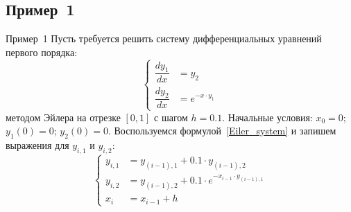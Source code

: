 \documentclass[aspectratio=169, mathserif]{beamer}	%
\begin{document}
\subsection{Пример~1}
\begin{frame}[fragile, ]{Пример~1}\label{slide:example1}
\scriptsize
Пусть требуется решить систему дифференциальных уравнений первого порядка:
\vfill
\begin{equation*}
	\left\{
	\begin{aligned}
		\dfrac{dy_1}{dx} &= y_2 \\
		\dfrac{dy_2}{dx} &= e^{-x\cdot y_1}
	\end{aligned}
	\right.
\end{equation*}
\vfill
\noindent методом Эйлера на отрезке $[0, 1]$ с шагом $h=0.1$.
\vfill
Начальные условия: $x_0 = 0$; $y_1(0)=0$; $y_2(0)=0$.
\vfill
Воспользуемся формулой~\eqref{Eiler_system} и запишем выражения для $y_{i,1}$ и $y_{i,2}$:
\vfill
\begin{equation*}
	\left\{
	\begin{aligned}
		y_{i,1} &= y_{(i-1),1} + 0.1 \cdot y_{(i-1),2} \\
		y_{i,2} &= y_{(i-1),2} + 0.1 \cdot e^{-x_{i-1}\cdot y_{(i-1),1}} \\
		x_i &= x_{i-1} + h
	\end{aligned}
	\right.
\end{equation*}
\vfill
\end{frame}
\end{document}
